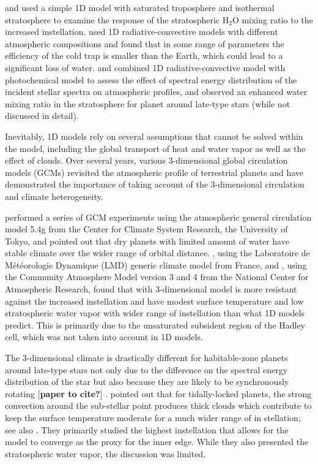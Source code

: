 \documentclass[11pt,numberedappendix,twocolappendix,]{emulateapj}
\def\water{H$_2$O }
\def\memo#1{\color{red}$[${\bf #1}$]$ \color{black}}
\begin{document}
\citet{Kasting1993} and \citet{Kopparapu2013} used a simple 1D model with saturated troposphere and isothermal stratosphere to examine the response of the stratospheric \water mixing ratio to the increased instellation. 
% 
\citet{Wordsworth2013} used 1D radiative-convective models with different atmospheric compositions and found that in some range of parameters the efficiency of the cold trap is smaller than the Earth, which could lead to a significant loss of water. 
%
\citet{Rugheimer2013} and \citet{Rugheimer2015} combined 1D radiative-convective model with photochemical model to assess the effect of spectral energy distribution of the incident stellar spectra on atmospheric profiles, and observed an enhanced water mixing ratio in the stratosphere for planet around late-type stars (while not discussed in detail). 

Inevitably, 1D models rely on several assumptions that cannot be solved within the model, including the global transport of heat and water vapor as well as the effect of clouds. 
Over several years, various 3-dimensional global circulation models (GCMs) revisited the atmospheric profile of terrestrial planets and have demonstrated the importance of taking account of the 3-dimensional circulation and climate heterogeneity. 

 \citet{Abe2011} performed a series of GCM experiments using the atmospheric general circulation model 5.4g from the Center for Climate System Research, the University of Tokyo, and pointed out that dry planets with limited amount of water have stable climate over the wider range of orbital distance. 
\citet{Leconte2013b}, using the Laboratoire de M\'et\'eorologie Dynamique (LMD) generic climate model from France, and 
\citet{Wolf2014, Wolf2015}, using the Community Atmosphere Model version 3 and 4 from the National Center for Atmospheric Research, found that with 3-dimensional model is more resistant against the increased instellation and have modest surface temperature and low stratospheric water vapor with wider range of instellation than what 1D models predict. This is primarily due to the unsaturated subsident region of the Hadley cell, which was not taken into account in 1D models. 

The 3-dimensional climate is drastically different for habitable-zone planets around late-type stars not only due to the difference on the spectral energy distribution of the star but also because they are likely to be synchronously rotating \memo{paper to cite?}. 
%
\citet{Yang2013} pointed out that for tidally-locked planets, the strong convection around the sub-stellar point produces thick clouds which contribute to keep the surface temperature moderate for a much wider range of in stellation; see also \citet{Yang2014,Way2015,Kopparapu2016}. 
They primarily studied the highest instellation that allows for the model to converge as the proxy for the inner edge. 
While they also presented the stratospheric water vapor, the discussion was limited. 
\end{document}
